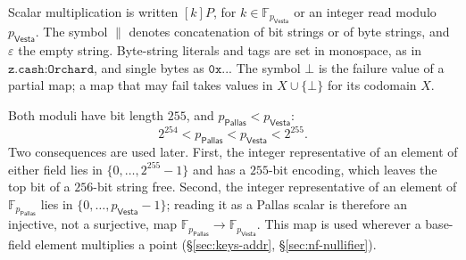 \documentclass[11pt,a4paper]{article}
\theoremstyle{definition}
\newcommand{\F}{\mathbb{F}}
\newcommand{\Pallas}{\ensuremath{\mathsf{Pallas}}}
\newcommand{\Vesta}{\ensuremath{\mathsf{Vesta}}}
\begin{document}
Scalar multiplication is written $[k]P$, for $k \in \F_{p_{\Vesta}}$ or an
integer read modulo $p_{\Vesta}$. The symbol $\|$ denotes concatenation of
bit strings or of byte strings, and $\varepsilon$ the empty string.
Byte-string literals and tags are set in monospace, as in
$\texttt{z.cash:Orchard}$, and single bytes as $\mathtt{0x..}$. The symbol
$\bot$ is the failure value of a partial map; a map that may fail takes
values in $X \cup \{\bot\}$ for its codomain $X$.

Both moduli have bit length $255$, and $p_{\Pallas} < p_{\Vesta}$:
\[
  2^{254} < p_{\Pallas} < p_{\Vesta} < 2^{255}.
\]
Two consequences are used later. First, the integer representative of an
element of either field lies in $\{0, \dots, 2^{255} - 1\}$ and has a
$255$-bit encoding, which leaves the top bit of a $256$-bit string free.
Second, the integer representative of an element of $\F_{p_{\Pallas}}$ lies
in $\{0, \dots, p_{\Vesta} - 1\}$; reading it as a Pallas scalar is
therefore an injective, not a surjective, map
$\F_{p_{\Pallas}} \to \F_{p_{\Vesta}}$. This map is used wherever a
base-field element multiplies a point (\S\ref{sec:keys-addr},
\S\ref{sec:nf-nullifier}).
\end{document}
